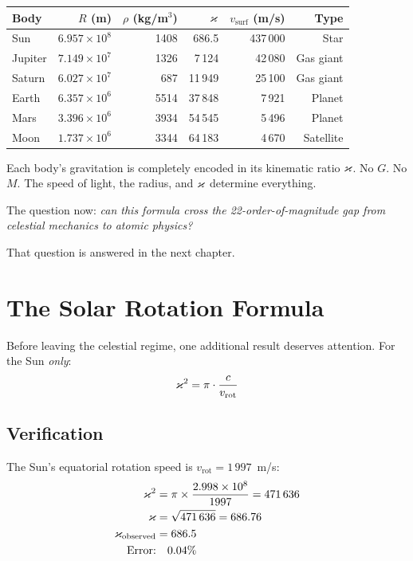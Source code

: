 \begin{center}
\begin{tabular}{lrrrrr}
\toprule
\textbf{Body} & $R$ (m) & $\rho$ (kg/m$^3$) & $\varkappa$ & $v_{\text{surf}}$ (m/s) & Type \\
\midrule
Sun      & $6.957 \times 10^8$  & 1408 & 686.5    & 437\,000  & Star \\
Jupiter  & $7.149 \times 10^7$  & 1326 & 7\,124   &  42\,080  & Gas giant \\
Saturn   & $6.027 \times 10^7$  &  687 & 11\,949  &  25\,100  & Gas giant \\
Earth    & $6.357 \times 10^6$  & 5514 & 37\,848  &   7\,921  & Planet \\
Mars     & $3.396 \times 10^6$  & 3934 & 54\,545  &   5\,496  & Planet \\
Moon     & $1.737 \times 10^6$  & 3344 & 64\,183  &   4\,670  & Satellite \\
\bottomrule
\end{tabular}
\end{center}

Each body's gravitation is completely encoded in its kinematic ratio $\varkappa$.  No $G$.  No $M$.  The speed of light, the radius, and $\varkappa$ determine everything.

The question now: \emph{can this formula cross the 22-order-of-magnitude gap from celestial mechanics to atomic physics?}

That question is answered in the next chapter.


\section{The Solar Rotation Formula}
\label{sec:rotation}

Before leaving the celestial regime, one additional result deserves attention.  For the Sun \emph{only}:
\begin{equation}\label{eq:k-rotation}
  \varkappa^2 = \pi \cdot \frac{c}{v_{\text{rot}}}
\end{equation}

\subsection{Verification}

The Sun's equatorial rotation speed is $v_{\text{rot}} = 1\,997$~m/s:
\begin{align}
  \varkappa^2 &= \pi \times \frac{2.998 \times 10^8}{1997} = 471\,636 \\
  \varkappa &= \sqrt{471\,636} = 686.76 \\
  \varkappa_{\text{observed}} &= 686.5 \\
  \text{Error:} &\quad 0.04\%
\end{align}

